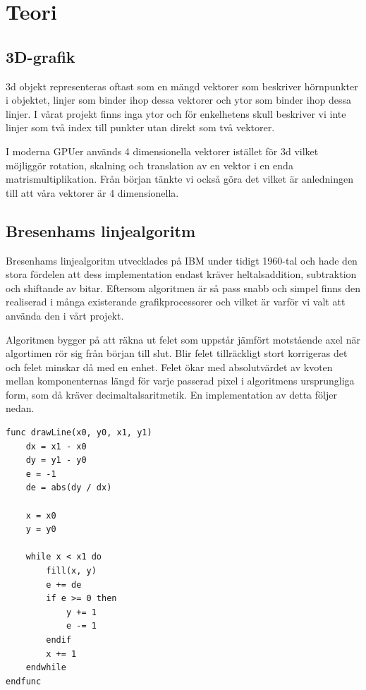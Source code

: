 \documentclass[a4paper]{article}
\begin{document}
    


    \section{Teori}
    \subsection{3D-grafik}
    3d objekt representeras oftast som en mängd vektorer som beskriver hörnpunkter i
    objektet, linjer som binder ihop dessa vektorer och ytor som binder ihop dessa
    linjer. I vårat projekt finns inga ytor och för enkelhetens skull beskriver vi
    inte linjer som två index till punkter utan direkt som två vektorer. 

    I moderna GPUer används 4 dimensionella  vektorer istället för 3d vilket
    möjliggör rotation, skalning och translation av en vektor i en enda
    matrismultiplikation. Från början tänkte vi också göra det vilket är anledningen
    till att våra  vektorer är 4 dimensionella. 

    
    \subsection{Bresenhams linjealgoritm}
    Bresenhams linjealgoritm utvecklades på IBM under tidigt 1960-tal och hade den
    stora fördelen att dess implementation endast kräver heltalsaddition,
    subtraktion och shiftande av bitar. Eftersom algoritmen är så pass snabb och
    simpel finns den realiserad i många existerande grafikprocessorer och vilket är
    varför vi valt att använda den i vårt projekt.  

    Algoritmen bygger på att räkna ut felet som uppstår jämfört motstående axel när
    algortimen rör sig från början till slut. Blir felet tillräckligt stort
    korrigeras det och felet minskar då med en enhet. Felet ökar med absolutvärdet
    av kvoten mellan komponenternas längd för varje passerad pixel i algoritmens
    ursprungliga form, som då kräver decimaltalsaritmetik. En implementation av
    detta följer nedan. 

    \begin{lstlisting}[]
func drawLine(x0, y0, x1, y1)
    dx = x1 - x0
    dy = y1 - y0
    e = -1
    de = abs(dy / dx)

    x = x0
    y = y0

    while x < x1 do
        fill(x, y)
        e += de
        if e >= 0 then
            y += 1
            e -= 1
        endif
        x += 1
    endwhile
endfunc
    \end{lstlisting}
\end{document}
